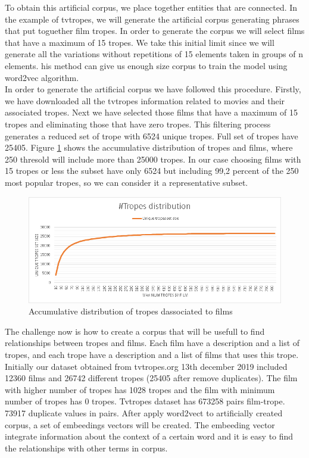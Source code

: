 \documentclass[letterpaper]{article}
\begin{document}
 	To obtain this artificial corpus, we place together entities that are connected. In the example of tvtropes, we will generate the artificial corpus generating phrases that put toguether film tropes. In order to generate the corpus we will select films that have a maximum of 15 tropes. We take this initial limit since we will generate all the variations without repetitions of 15 elements taken in groups of n elements. his method can give us enough size corpus to train the model using word2vec algorithm. \\
	In order to generate the artificial corpus we have followed this procedure. Firstly, we have downloaded all the tvtropes information related to movies and their associated tropes. Next we have selected those films that have a maximum of 15 tropes and eliminating those that have zero tropes. This filtering process generates a reduced set of trope with 6524 unique tropes. Full set of tropes have 25405. Figure  \ref{fig:tropesdistributionasociatedtofilms} shows the accumulative distribution of tropes and films, where 250 thresold will include more than 25000 tropes. In our case choosing films with 15 tropes or less the subset have only 6524 but including 99,2 percent of the 250 most popular tropes, so we can consider it a representative subset.\\
	
	\begin{figure}
		\centering
		\includegraphics[width=0.9\linewidth]{../images/tropes_distribution_chart.png}
		\caption{Accumulative distribution of tropes dassociated to films}
		\label{fig:tropesdistributionasociatedtofilms}
	\end{figure}
	 
	The challenge now is how to create a corpus that will be usefull to find relationships between tropes and films. Each film have a description and a list of tropes, and each trope have a description and a list of films that uses this trope. Initially our dataset obtained from tvtropes.org 13th december 2019 included 12360 films and 26742 different tropes (25405 after remove duplicates). The film with higher number of tropes has 1028 tropes and the film with minimum number of tropes has 0 tropes. Tvtropes dataset has 673258 pairs film-trope. 73917 duplicate values in pairs. After apply word2vect to artificially created corpus, a set of embeedings vectors will be created. The embeeding vector integrate information about the context of a certain word and it is easy to find the relationships with other terms in corpus.\\
	
\end{document}
